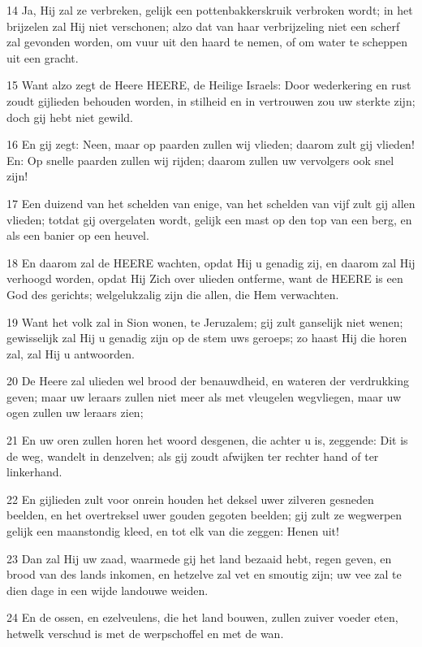 \par 14 Ja, Hij zal ze verbreken, gelijk een pottenbakkerskruik verbroken wordt; in het brijzelen zal Hij niet verschonen; alzo dat van haar verbrijzeling niet een scherf zal gevonden worden, om vuur uit den haard te nemen, of om water te scheppen uit een gracht.
\par 15 Want alzo zegt de Heere HEERE, de Heilige Israels: Door wederkering en rust zoudt gijlieden behouden worden, in stilheid en in vertrouwen zou uw sterkte zijn; doch gij hebt niet gewild.
\par 16 En gij zegt: Neen, maar op paarden zullen wij vlieden; daarom zult gij vlieden! En: Op snelle paarden zullen wij rijden; daarom zullen uw vervolgers ook snel zijn!
\par 17 Een duizend van het schelden van enige, van het schelden van vijf zult gij allen vlieden; totdat gij overgelaten wordt, gelijk een mast op den top van een berg, en als een banier op een heuvel.
\par 18 En daarom zal de HEERE wachten, opdat Hij u genadig zij, en daarom zal Hij verhoogd worden, opdat Hij Zich over ulieden ontferme, want de HEERE is een God des gerichts; welgelukzalig zijn die allen, die Hem verwachten.
\par 19 Want het volk zal in Sion wonen, te Jeruzalem; gij zult ganselijk niet wenen; gewisselijk zal Hij u genadig zijn op de stem uws geroeps; zo haast Hij die horen zal, zal Hij u antwoorden.
\par 20 De Heere zal ulieden wel brood der benauwdheid, en wateren der verdrukking geven; maar uw leraars zullen niet meer als met vleugelen wegvliegen, maar uw ogen zullen uw leraars zien;
\par 21 En uw oren zullen horen het woord desgenen, die achter u is, zeggende: Dit is de weg, wandelt in denzelven; als gij zoudt afwijken ter rechter hand of ter linkerhand.
\par 22 En gijlieden zult voor onrein houden het deksel uwer zilveren gesneden beelden, en het overtreksel uwer gouden gegoten beelden; gij zult ze wegwerpen gelijk een maanstondig kleed, en tot elk van die zeggen: Henen uit!
\par 23 Dan zal Hij uw zaad, waarmede gij het land bezaaid hebt, regen geven, en brood van des lands inkomen, en hetzelve zal vet en smoutig zijn; uw vee zal te dien dage in een wijde landouwe weiden.
\par 24 En de ossen, en ezelveulens, die het land bouwen, zullen zuiver voeder eten, hetwelk verschud is met de werpschoffel en met de wan.
